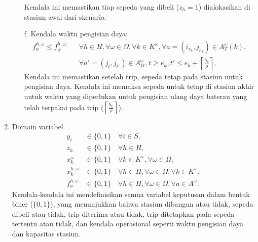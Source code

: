 \begin{enumerate}
\begin{enumerate}
    Kendala ini memastikan tiap sepeda yang dibeli ($z_h = 1$) dialokasikan di stasiun awal dari skenario.\\
    \item [f.] Kendala waktu pengisian daya:
    \begin{equation}
    \begin{aligned}
    f_a^{h,\omega} \leq f_{a'}^{h,\omega} \quad & \forall h \in H, \forall \omega \in \Omega, \forall k \in K^\omega, \forall a = (i_{s_k}, j_{e_k}) \in A_T^\omega(k), \\
    & \forall a' = (j_t, j_{t'}) \in A_W^\omega, t \geq e_k, t' \leq e_k + \left\lceil \frac{b_k}{\rho} \right\rceil,
    \end{aligned}
    \end{equation}
    Kendala ini memastikan setelah trip, sepeda tetap pada stasiun untuk pengisian daya. Kendala ini memaksa sepeda untuk tetap di stasiun akhir untuk waktu yang diperlukan untuk pengisian ulang daya baterau yang telah terpakai pada trip ($\left\lceil \frac{b_k}{\rho} \right\rceil$).\\ 
    \end{enumerate}
   
    
    
    
    
    \item Domain variabel
    \begin{align}
    y_i &\in \{0, 1\} \quad \forall i \in S, \\
    z_h &\in \{0, 1\} \quad \forall h \in H, \\
    x_k^\omega &\in \{0, 1\} \quad \forall k \in K^\omega, \forall \omega \in \Omega, \\
    x_k^{h,\omega} &\in \{0, 1\} \quad \forall h \in H, \forall \omega \in \Omega, \forall k \in K^\omega, \\
    f_a^{h,\omega} &\in \{0, 1\} \quad \forall h \in H, \forall \omega \in \Omega, \forall a \in A^\omega.
    \end{align}
    Kendala-kendala ini mendefinisikan semua variabel keputusan dalam bentuk biner ($\{0, 1\}$), yang menunjukkan bahwa stasiun dibangun atau tidak, sepeda dibeli atau tidak, trip diterima atau tidak, trip ditetapkan pada sepeda tertentu atau tidak, dan kendala operasional seperti waktu pengisian daya dan kapasitas stasiun.
    \end{enumerate}




